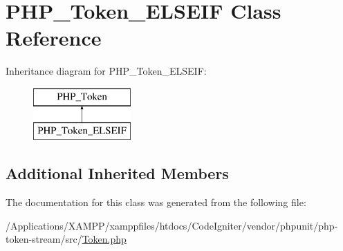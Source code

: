 \hypertarget{class_p_h_p___token___e_l_s_e_i_f}{}\section{P\+H\+P\+\_\+\+Token\+\_\+\+E\+L\+S\+E\+IF Class Reference}
\label{class_p_h_p___token___e_l_s_e_i_f}
Inheritance diagram for P\+H\+P\+\_\+\+Token\+\_\+\+E\+L\+S\+E\+IF\+:\begin{figure}[H]
\begin{center}
\leavevmode
\includegraphics[height=2.000000cm]{class_p_h_p___token___e_l_s_e_i_f}
\end{center}
\end{figure}
\subsection*{Additional Inherited Members}


The documentation for this class was generated from the following file\+:\begin{DoxyCompactItemize}
\item 
/\+Applications/\+X\+A\+M\+P\+P/xamppfiles/htdocs/\+Code\+Igniter/vendor/phpunit/php-\/token-\/stream/src/\mbox{\hyperlink{_token_8php}{Token.\+php}}\end{DoxyCompactItemize}
